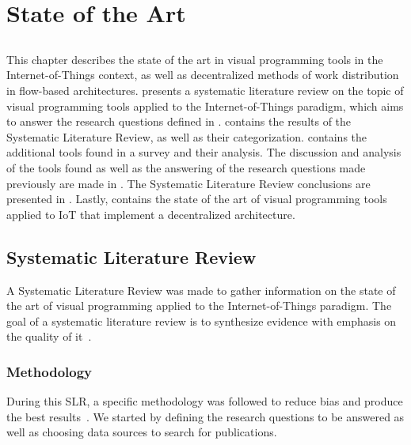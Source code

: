 \chapter{State of the Art} \label{chap:sota}

\section*{}

\minitoc \mtcskip \noindent
This chapter describes the state of the art in visual programming tools in the Internet-of-Things context, as well as decentralized methods of work distribution in flow-based architectures.  presents a systematic literature review on the topic of visual programming tools applied to the Internet-of-Things paradigm, which aims to answer the research questions defined in .  contains the results of the Systematic Literature Review, as well as their categorization.  contains the additional tools found in a survey and their analysis. The discussion and analysis of the tools found as well as the answering of the research questions made previously are made in . The Systematic Literature Review conclusions are presented in . Lastly,  contains the state of the art of visual programming tools applied to IoT that implement a decentralized architecture.

\section{Systematic Literature Review}\label{sec:slr}

A Systematic Literature Review was made to gather information on the state of the art of visual programming applied to the Internet-of-Things paradigm. The goal of a systematic literature review is to synthesize evidence with emphasis on the quality of it~\cite{SLR_guidelines}.

\subsection{Methodology}\label{sec:methodology}

During this SLR, a specific methodology was followed to reduce bias and produce the best results~\cite{SLR_guidelines}. We started by defining the research questions to be answered as well as choosing data sources to search for publications.

